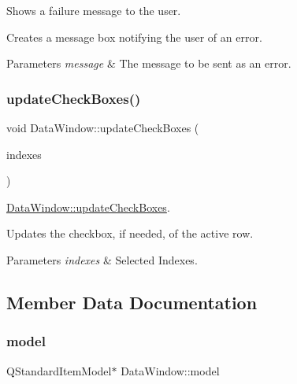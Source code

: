 Shows a failure message to the user. 

Creates a message box notifying the user of an error. 
\begin{DoxyParams}{Parameters}
{\em message} & The message to be sent as an error. \\
\hline
\end{DoxyParams}
\mbox{\label{class_data_window_a19d79c091d0b19d22eba8b21a7360cf5}} 
\subsubsection{\texorpdfstring{update\+Check\+Boxes()}{updateCheckBoxes()}}
{\footnotesize\ttfamily void Data\+Window\+::update\+Check\+Boxes (\begin{DoxyParamCaption}\item[{Q\+Model\+Index\+List}]{indexes }\end{DoxyParamCaption})\hspace{0.3cm}{\ttfamily [private]}}



\hyperlink{class_data_window_a19d79c091d0b19d22eba8b21a7360cf5}{Data\+Window\+::update\+Check\+Boxes}. 

Updates the checkbox, if needed, of the active row. 
\begin{DoxyParams}{Parameters}
{\em indexes} & Selected Indexes. \\
\hline
\end{DoxyParams}


\subsection{Member Data Documentation}
\mbox{\label{class_data_window_a29b749f31459b7bf9a8a16d69fafabf9}} 
\subsubsection{\texorpdfstring{model}{model}}
{\footnotesize\ttfamily Q\+Standard\+Item\+Model$\ast$ Data\+Window\+::model\hspace{0.3cm}{\ttfamily [private]}}



